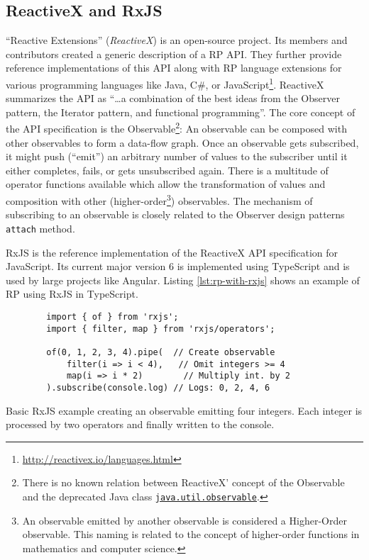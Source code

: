 \documentclass[sigplan,screen]{acmart}
\begin{document}
\subsection{ReactiveX and RxJS}

``Reactive Extensions'' (\emph{ReactiveX}) is an open-source project. Its members and contributors created a generic description of a RP API. They further provide reference implementations of this API along with RP language extensions for various programming languages like Java, C\#, or JavaScript\footnote{\url{http://reactivex.io/languages.html}}. ReactiveX summarizes the API as ``\dots a combination of the best ideas from the Observer pattern, the Iterator pattern, and functional programming''\cite{reactivex}. The core concept of the API specification is the Observable\footnote{There is no known relation between ReactiveX' concept of the Observable and the deprecated Java class \href{https://docs.oracle.com/en/java/javase/11/docs/api/java.base/java/util/Observable.html}{\texttt{java.util.observable}}.}: An observable can be composed with other observables to form a data-flow graph. Once an observable gets subscribed, it might push (``emit'') an arbitrary number of values to the subscriber until it either completes, fails, or gets unsubscribed again. There is a multitude of operator functions available which allow the transformation of values and composition with other (higher-order\footnote{An observable emitted by another observable is considered a Higher-Order observable. This naming is related to the concept of higher-order functions in mathematics and computer science.}) observables. The mechanism of subscribing to an observable is closely related to the Observer design patterns \texttt{attach} method.

RxJS\cite{rxjs} is the reference implementation of the ReactiveX API specification for JavaScript. Its current major version 6 is implemented using TypeScript and is used by large projects like Angular\cite{angualrrxjs}. Listing \ref{lst:rp-with-rxjs} shows an example of RP using RxJS in TypeScript.

\begin{listing}
	\begin{verbatim}
		import { of } from 'rxjs';
		import { filter, map } from 'rxjs/operators';

		of(0, 1, 2, 3, 4).pipe(  // Create observable
			filter(i => i < 4),	  // Omit integers >= 4
			map(i => i * 2)        // Multiply int. by 2
		).subscribe(console.log) // Logs: 0, 2, 4, 6
	\end{verbatim}
	\caption{Basic RxJS example creating an observable emitting four integers. Each integer is processed by two operators and finally written to the console.}
	\label{lst:rp-with-rxjs}
\end{listing}
\end{document}
